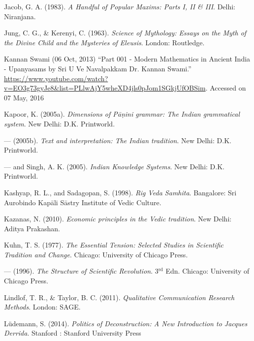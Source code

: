 \begin{thebibliography}{99}


Jacob, G. A. (1983). {\sl A Handful of Popular Maxims: Parts I, II \& III}. Delhi: Niranjana.

Jung, C. G., \& Kerenyi, C. (1963). {\sl Science of Mythology: Essays on the Myth of the Divine Child and the Mysteries of Eleusis}. London: Routledge. 

Kannan Swami (06 Oct, 2013) ``Part 001 - Modern Mathematics in Ancient India - Upanyasams by Sri U Ve Navalpakkam Dr. Kannan Swami.'' \url{https://www.youtube.com/watch?v=EO3g73gyJe8&list=PLlwAjY5wheXD4jls0pJom1SGkjUfOBSim}. Accessed on 07 May, 2016

Kapoor, K. (2005a). {\sl Dimensions of Pāṇini grammar: The Indian grammatical system}. New Delhi: D.K. Printworld.

--- (2005b). {\sl Text and interpretation: The Indian tradition}. New Delhi: D.K. Printworld. 

--- and Singh, A. K. (2005). {\sl Indian Knowledge Systems}. New Delhi: D.K. Printworld.

Kashyap, R. L., and Sadagopan, S. (1998). {\sl Rig Veda Samhita}. Bangalore: Sri Aurobindo Kapāli Sāstry Institute of Vedic Culture.

Kazanas, N. (2010). {\sl Economic principles in the Vedic tradition}. New Delhi: Aditya Prakashan.

Kuhn, T. S. (1977). {\sl The Essential Tension: Selected Studies in Scientific Tradition and Change}. Chicago: University of Chicago Press.

--- (1996). {\sl The Structure of Scientific Revolution}. 3$^{\text{rd}}$ Edn. Chicago: University of Chicago Press.

Lindlof, T. R., \& Taylor, B. C. (2011). {\sl Qualitative Communication Research Methods}. London: SAGE.

Lüdemann, S. (2014). {\sl Politics of Deconstruction: A New Introduction to Jacques Derrida}. Stanford : Stanford University Press


\end{thebibliography}
